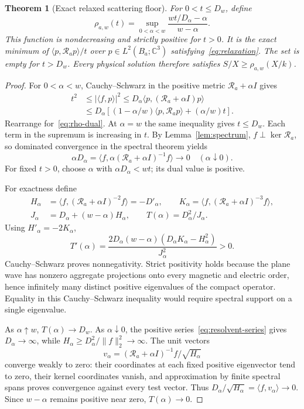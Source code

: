 \documentclass[11pt]{article}
\newtheorem{theorem}{Theorem}[section]
\newcommand{\ip}[2]{\langle #1,#2\rangle}
\newcommand{\norm}[1]{\lVert #1\rVert}
\newcommand{\abs}[1]{\lvert #1\rvert}
\begin{document}
\begin{theorem}[Exact relaxed scattering floor]\label{thm:floor}
For $0<t\leq D_w$, define
\begin{equation}\label{eq:rho-dual}
 \rho_{a,w}(t)=\sup_{0<\alpha<w}
 \frac{wt/D_\alpha-\alpha}{w-\alpha}.
\end{equation}
This function is nondecreasing and strictly positive for $t>0$. It is the exact minimum of $\ip p{\mathcal R_ap}/t$ over $p\in L^2(B_a;\mathbb C^3)$ satisfying~\eqref{eq:relaxation}. The set is empty for $t>D_w$. Every physical solution therefore satisfies $S/X\geq\rho_{a,w}(X/k)$.
\end{theorem}
\begin{proof}
For $0<\alpha<w$, Cauchy--Schwarz in the positive metric $\mathcal R_a+\alpha I$ gives
\begin{align*}
 t^2&\leq\abs{\ip f p}^2
 \leq D_\alpha\ip p{(\mathcal R_a+\alpha I)p}\\
 &\leq D_\alpha\left[(1-\alpha/w)\ip p{\mathcal R_ap}+(\alpha/w)t\right].
\end{align*}
Rearrange for~\eqref{eq:rho-dual}. At $\alpha=w$ the same inequality gives $t\leq D_w$. Each term in the supremum is increasing in $t$. By Lemma~\ref{lem:spectrum}, $f\perp\ker\mathcal R_a$, so dominated convergence in the spectral theorem yields
\[
 \alpha D_\alpha=\ip f{\alpha(\mathcal R_a+\alpha I)^{-1}f}\longrightarrow0
 \quad(\alpha\downarrow0).
\]
For fixed $t>0$, choose $\alpha$ with $\alpha D_\alpha<wt$; its dual value is positive.

For exactness define
\begin{align*}
 H_\alpha&=\ip f{(\mathcal R_a+\alpha I)^{-2}f}=-D'_\alpha,\qquad
 K_\alpha=\ip f{(\mathcal R_a+\alpha I)^{-3}f},\\
 J_\alpha&=D_\alpha+(w-\alpha)H_\alpha,\qquad
 T(\alpha)=D_\alpha^2/J_\alpha.
\end{align*}
Using $H'_\alpha=-2K_\alpha$,
\begin{equation}\label{eq:Tderivative}
 T'(\alpha)=\frac{2D_\alpha(w-\alpha)(D_\alpha K_\alpha-H_\alpha^2)}{J_\alpha^2}>0.
\end{equation}
Cauchy--Schwarz proves nonnegativity. Strict positivity holds because the plane wave has nonzero aggregate projections onto every magnetic and electric order, hence infinitely many distinct positive eigenvalues of the compact operator. Equality in this Cauchy--Schwarz inequality would require spectral support on a single eigenvalue.

As $\alpha\uparrow w$, $T(\alpha)\to D_w$. As $\alpha\downarrow0$, the positive series~\eqref{eq:resolvent-series} gives $D_\alpha\to\infty$, while $H_\alpha\geq D_\alpha^2/\norm f_2^2\to\infty$. The unit vectors
\[
 v_\alpha=(\mathcal R_a+\alpha I)^{-1}f/\sqrt{H_\alpha}
\]
converge weakly to zero: their coordinates at each fixed positive eigenvector tend to zero, their kernel coordinates vanish, and approximation by finite spectral spans proves convergence against every test vector. Thus $D_\alpha/\sqrt{H_\alpha}=\ip f{v_\alpha}\to0$. Since $w-\alpha$ remains positive near zero, $T(\alpha)\to0$.


\end{proof}
\end{document}
